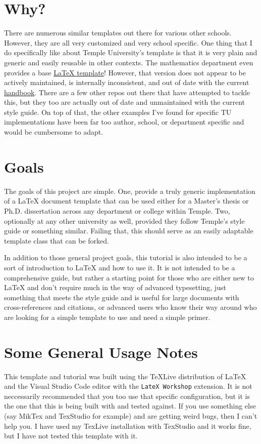 \documentclass{thesis-dissertation}
\begin{document}
\section{Why?}
There are numerous similar templates out there for various other schools. However, they are all very customized and very school specific. One thing that I do specifically like about Temple University's template is that it is very plain and generic and easily reusable in other contexts. The mathematics department even provides a base \href{https://cst.temple.edu/department-mathematics/graduate/current-students/tu-thesis}{\LaTeX{} template}! However, that version does not appear to be actively maintained, is internally inconsistent, and out of date with the current \href{https://grad.temple.edu/resources/dissertation-thesis-handbook}{handbook}. There are a few other repos out there that have attempted to tackle this, but they too are actually out of date and unmaintained with the current style guide. On top of that, the other examples I've found for specific TU implementations have been far too author, school, or department specific and would be cumbersome to adapt.
\section{Goals}
The goals of this project are simple. One, provide a truly generic implementation of a LaTeX document template that can be used either for a Master's thesis or Ph.D. dissertation across any department or college within Temple. Two, optionally at any other university as well, provided they follow Temple's style guide or something similar. Failing that, this should serve as an easily adaptable template class that can be forked.

In addition to those general project goals, this tutorial is also intended to be a sort of introduction to \LaTeX{} and how to use it. It is not intended to be a comprehensive guide, but rather a starting point for those who are either new to \LaTeX{} and don't require much in the way of advanced typesetting, just something that meets the style guide and is useful for large documents with cross-references and citations, or advanced users who know their way around who are looking for a simple template to use and need a simple primer.

\section{Some General Usage Notes}
This template and tutorial was built using the TeXLive distribution of \LaTeX{} and the Visual Studio Code editor with the \texttt{LateX Workshop} extension. It is not neccessarily recommended that you too use that specific configuration, but it is the one that this is being built with and tested against. If you use something else (say MikTex and TexStudio for example) and are getting weird bugs, then I can't help you. I have used my TexLive installation with TexStudio and it works fine, but I have not tested this template with it. 
\end{document}
